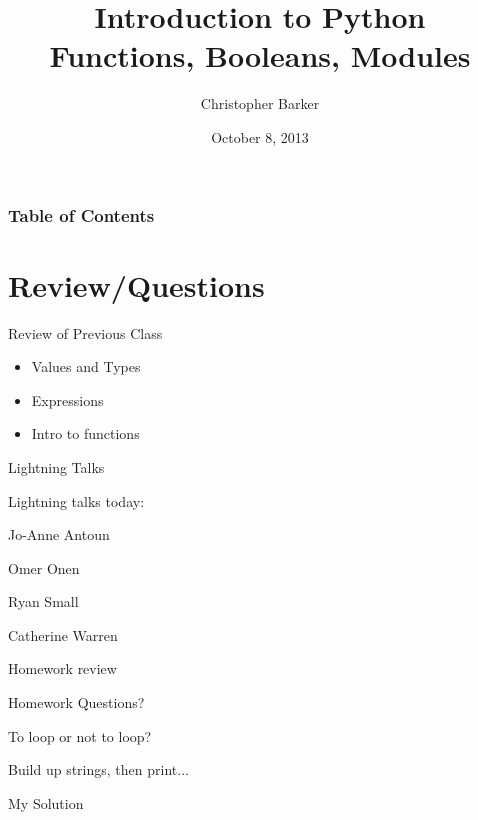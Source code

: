 \documentclass{beamer}
\title[Intro to Python: Week 2]{Introduction  to Python\\ Functions, Booleans, Modules}
\author{Christopher Barker}
\institute{UW Continuing Education}
\date{October 8, 2013}
\begin{document}
\begin{frame}
  \titlepage
\end{frame}

\begin{frame}
\frametitle{Table of Contents}
  \tableofcontents
\end{frame}


\section{Review/Questions}

\begin{frame}[fragile]{Review of Previous Class}

\begin{itemize}
  \item Values and Types
  \item Expressions
  \item Intro to functions
\end{itemize}

\end{frame}


\begin{frame}[fragile]{Lightning Talks}

\vfill
{\LARGE Lightning talks today:}

\vfill
{\Large
Jo-Anne Antoun 

\vfill
Omer Onen 

\vfill
Ryan Small

\vfill
Catherine Warren 
}
\vfill

\end{frame}


\begin{frame}[fragile]{Homework review}

  \vfill
  {\Large Homework Questions? }

  \vfill
  {\Large To loop or not to loop?}

  \vfill
  {\Large Build up strings, then print...}

  \vfill
  {\Large My Solution}

  \vfill

\end{frame}
\end{document}
